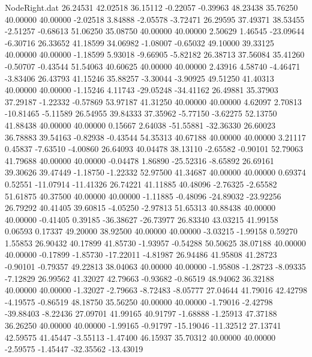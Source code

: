 \begin{filecontents}{NodeRight.dat}
  26.24531   42.02518   36.15112    -0.22057   -0.39963   48.23438   35.76250   40.00000   40.00000   -2.02518    3.84888   -2.05578   -3.72471
  26.29595   37.49371   38.53455    -2.51257   -0.68613   51.06250   35.08750   40.00000   40.00000    2.50629    1.46545  -23.09644   -6.30716
  26.33652   41.18599   34.06982    -1.08007   -0.65032   49.10000   39.33125   40.00000   40.00000   -1.18599    5.93018   -9.66905   -5.82182
  26.38713   37.56084   35.41260    -0.50707   -0.43544   51.54063   40.60625   40.00000   40.00000    2.43916    4.58740   -4.46471   -3.83406
  26.43793   41.15246   35.88257    -3.30044   -3.90925   49.51250   41.40313   40.00000   40.00000   -1.15246    4.11743  -29.05248  -34.41162
  26.49881   35.37903   37.29187    -1.22332   -0.57869   53.97187   41.31250   40.00000   40.00000    4.62097    2.70813  -10.81465   -5.11589
  26.54955   39.84333   37.35962    -5.77150   -3.62275   52.13750   41.88438   40.00000   40.00000    0.15667    2.64038  -51.55881  -32.36330
  26.60023   36.78883   39.54163    -0.82938   -0.43544   54.35313   40.67188   40.00000   40.00000    3.21117    0.45837   -7.63510   -4.00860
  26.64093   40.04478   38.13110    -2.65582   -0.90101   52.79063   41.79688   40.00000   40.00000   -0.04478    1.86890  -25.52316   -8.65892
  26.69161   39.30626   39.47449    -1.18750   -1.22332   52.97500   41.34687   40.00000   40.00000    0.69374    0.52551  -11.07914  -11.41326
  26.74221   41.11885   40.48096    -2.76325   -2.65582   51.61875   40.37500   40.00000   40.00000   -1.11885   -0.48096  -24.89032  -23.92256
  26.79292   40.41405   39.60815    -4.05250   -2.97813   51.65313   40.88438   40.00000   40.00000   -0.41405    0.39185  -36.38627  -26.73977
  26.83340   43.03215   41.99158     0.06593    0.17337   49.20000   38.92500   40.00000   40.00000   -3.03215   -1.99158    0.59270    1.55853
  26.90432   40.17899   41.85730    -1.93957   -0.54288   50.50625   38.07188   40.00000   40.00000   -0.17899   -1.85730  -17.22011   -4.81987
  26.94486   41.95808   41.28723    -0.90101   -0.79357   49.22813   38.04063   40.00000   40.00000   -1.95808   -1.28723   -8.09335   -7.12829
  26.99562   41.32027   42.79663    -0.93682   -0.86519   48.94062   36.32188   40.00000   40.00000   -1.32027   -2.79663   -8.72483   -8.05777
  27.04644   41.79016   42.42798    -4.19575   -0.86519   48.18750   35.56250   40.00000   40.00000   -1.79016   -2.42798  -39.88403   -8.22436
  27.09701   41.99165   40.91797    -1.68888   -1.25913   47.37188   36.26250   40.00000   40.00000   -1.99165   -0.91797  -15.19046  -11.32512
  27.13741   42.59575   41.45447    -3.55113   -1.47400   46.15937   35.70312   40.00000   40.00000   -2.59575   -1.45447  -32.35562  -13.43019

\end{filecontents}

